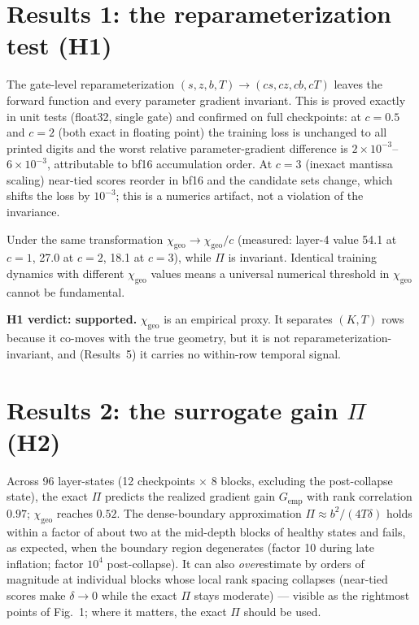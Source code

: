 \documentclass[11pt,a4paper]{article}
\newcommand{\chigeo}{\chi_{\mathrm{geo}}}
\newcommand{\Pisurr}{\Pi}
\begin{document}
\section{Results 1: the reparameterization test (H1)}

The gate-level reparameterization \((s, z, b, T) \to (c s, c z, c b, c T)\)
leaves the forward function and every parameter gradient invariant. This is
proved exactly in unit tests (float32, single gate) and confirmed on full
checkpoints: at \(c = 0.5\) and \(c = 2\) (both exact in floating point) the
training loss is unchanged to all printed digits and the worst relative
parameter-gradient difference is \(2\times10^{-3}\)--\(6\times10^{-3}\),
attributable to bf16 accumulation order. At \(c = 3\) (inexact mantissa
scaling) near-tied scores reorder in bf16 and the candidate sets change,
which shifts the loss by \(10^{-3}\); this is a numerics artifact, not a
violation of the invariance.

Under the same transformation \(\chigeo \to \chigeo/c\) (measured: layer-4
value 54.1 at \(c{=}1\), 27.0 at \(c{=}2\), 18.1 at \(c{=}3\)), while
\(\Pisurr\) is invariant. Identical training dynamics with different
\(\chigeo\) values means a universal numerical threshold in \(\chigeo\)
cannot be fundamental.

\textbf{H1 verdict: supported.} \(\chigeo\) is an empirical proxy. It
separates \((K,T)\) rows because it co-moves with the true geometry, but it
is not reparameterization-invariant, and (Results~5) it carries no
within-row temporal signal.

\section{Results 2: the surrogate gain \texorpdfstring{$\Pi$}{Pi} (H2)}

Across 96 layer-states (12 checkpoints \(\times\) 8 blocks, excluding the
post-collapse state), the exact \(\Pisurr\) predicts the realized gradient
gain \(G_{\mathrm{emp}}\) with rank correlation \(0.97\); \(\chigeo\)
reaches \(0.52\). The dense-boundary approximation
\(\Pisurr \approx b^2/(4T\delta)\) holds within a factor of about two at
the mid-depth blocks of healthy states and fails, as expected, when the
boundary region degenerates (factor 10 during late inflation; factor
\(10^{4}\) post-collapse). It can also \emph{over}estimate by orders of
magnitude at individual blocks whose local rank spacing collapses
(near-tied scores make \(\delta \to 0\) while the exact \(\Pisurr\)
stays moderate) --- visible as the rightmost points of
Fig.~1; where it matters, the exact \(\Pisurr\) should be used.
\end{document}
